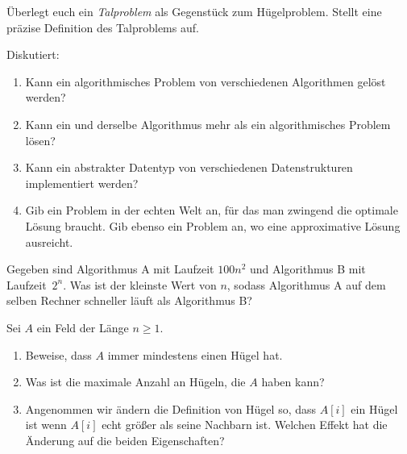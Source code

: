 \documentclass{uebung_cs}
\begin{document}
\begin{aufgabe}[Täler]
	Überlegt euch ein \emph{Talproblem} als Gegenstück zum Hügelproblem.
	Stellt eine präzise Definition des Talproblems auf.
\end{aufgabe}

\begin{aufgabe} Diskutiert:
	\begin{enumerate}
		\item Kann ein algorithmisches Problem von verschiedenen Algorithmen gelöst werden?
		\item Kann ein und derselbe Algorithmus mehr als ein algorithmisches Problem lösen?
		\item Kann ein abstrakter Datentyp von verschiedenen Datenstrukturen implementiert werden?
		\item Gib ein Problem in der echten Welt an, für das man zwingend die optimale Lösung braucht. Gib ebenso ein Problem an, wo eine approximative Lösung ausreicht.
	\end{enumerate}	
\end{aufgabe}

\begin{aufgabe}
	Gegeben sind Algorithmus A mit Laufzeit $100n^2$ und Algorithmus B mit Laufzeit~$2^n$.
	Was ist der kleinste Wert von $n$, sodass Algorithmus A auf dem selben Rechner schneller läuft als Algorithmus B?
\end{aufgabe}

\begin{aufgabe}[Hügeleigenschaften]
	Sei $A$ ein Feld der Länge $n\ge 1$.
	\begin{enumerate}
		\item Beweise, dass $A$ immer mindestens einen Hügel hat.
		\item Was ist die maximale Anzahl an Hügeln, die $A$ haben kann?
		\item Angenommen wir ändern die Definition von Hügel so, dass $A[i]$ ein Hügel ist wenn $A[i]$ echt größer als seine Nachbarn ist. Welchen Effekt hat die Änderung auf die beiden Eigenschaften?
	\end{enumerate}
\end{aufgabe}
\end{document}
